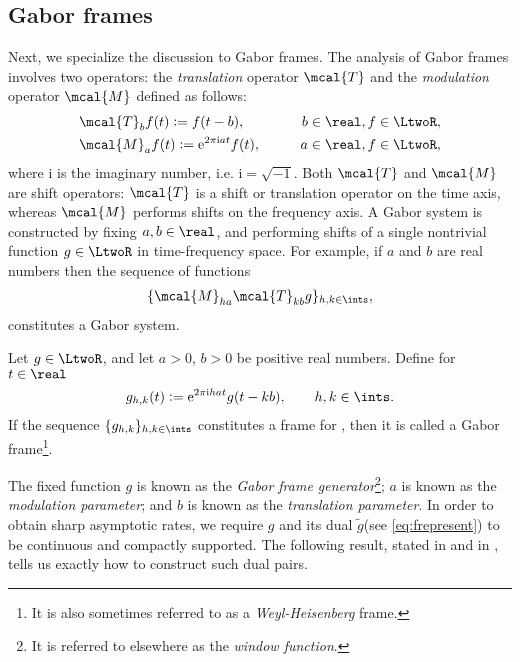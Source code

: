 \documentclass[a4paper, 12pt]{article}
\renewcommand{\i}{\mathrm{i}}
\newcommand{\tg}{\ensuremath{\tilde{g}}\xspace}
\begin{document}
\subsection{ Gabor frames}
Next, we specialize the discussion to Gabor frames. The analysis of Gabor frames involves two operators: the \emph{translation} operator  $\mcal{T}$ and  the \emph{modulation} operator $\mcal{M}$ defined as follows: 
\begin{align}
  & \mcal{T}_bf(t) := f(t -  b), &\qquad b \in \real, f \in \LtwoR, \label{eq:translation}\\
  & \mcal{M}_af(t) := \mathrm{e}^{2\pi \i at}f(t), &\qquad a \in \real, f \in \LtwoR,\label{eq:modulation} 
\end{align}
where $\i$ is the imaginary number, i.e.  $\i = \sqrt{-1}$.  Both $\mcal{T}$ and $\mcal{M}$ are shift operators: $\mcal{T}$ is a shift or translation operator on the time axis, whereas $\mcal{M}$ performs shifts on the frequency axis. A Gabor system is constructed by fixing $a, b \in \real$, and  performing shifts of a single nontrivial  function $g \in \LtwoR$  in time-frequency space. For example,  if $a$ and $b$ are real numbers then the sequence of functions  
\begin{align}
  \{\mcal{M}_{ha} \mcal{T}_{kb} g\}_{h,k \in \ints},\notag
  \label{}
\end{align}
constitutes  a Gabor system. 
\begin{defn}
  Let $g \in \LtwoR$, and let  $a > 0$, $b > 0$ be  positive real numbers. Define for $t \in \real$    
\begin{align}
  g_{h,k}(t) := \mathrm{e}^{2 \pi \i h a t }g(t - k b), \qquad   h,k \in \ints. \notag    
 \end{align}
 If the sequence $\{g_{h,k}\}_{h,k \in \ints}$ constitutes a  frame for \LtwoR, then it is called a Gabor frame\footnote{It is also sometimes referred to as a \emph{Weyl-Heisenberg} frame.}. 
\end{defn}
\noindent The fixed function $g$ is known as  the \emph{Gabor frame generator}\footnote{It is  referred to elsewhere as the \emph{window function}.}; $a$ is known as the \emph{modulation parameter}; and $b$ is known as the \emph{translation parameter}.   
In order to obtain sharp asymptotic rates, we require $g$ and its dual \tg (see \eqref{eq:frepresent}) to be continuous and compactly supported. The following result, stated  in  \cite[Lemma 1.2]{Christensen2006} and in  \cite[Proposition 2.4]{Zhang2008}, tells us exactly how to construct such dual pairs.
\end{document}
